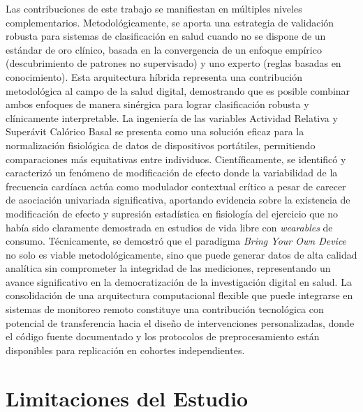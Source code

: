 
Las contribuciones de este trabajo se manifiestan en múltiples niveles complementarios. Metodológicamente, se aporta una estrategia de validación robusta para sistemas de clasificación en salud cuando no se dispone de un estándar de oro clínico, basada en la convergencia de un enfoque empírico (descubrimiento de patrones no supervisado) y uno experto (reglas basadas en conocimiento). Esta arquitectura híbrida representa una contribución metodológica al campo de la salud digital, demostrando que es posible combinar ambos enfoques de manera sinérgica para lograr clasificación robusta y clínicamente interpretable. La ingeniería de las variables Actividad Relativa y Superávit Calórico Basal se presenta como una solución eficaz para la normalización fisiológica de datos de dispositivos portátiles, permitiendo comparaciones más equitativas entre individuos. Científicamente, se identificó y caracterizó un fenómeno de modificación de efecto donde la variabilidad de la frecuencia cardíaca actúa como modulador contextual crítico a pesar de carecer de asociación univariada significativa, aportando evidencia sobre la existencia de modificación de efecto y supresión estadística en fisiología del ejercicio que no había sido claramente demostrada en estudios de vida libre con \textit{wearables} de consumo. Técnicamente, se demostró que el paradigma \textit{Bring Your Own Device} no solo es viable metodológicamente, sino que puede generar datos de alta calidad analítica sin comprometer la integridad de las mediciones, representando un avance significativo en la democratización de la investigación digital en salud. La consolidación de una arquitectura computacional flexible que puede integrarse en sistemas de monitoreo remoto constituye una contribución tecnológica con potencial de transferencia hacia el diseño de intervenciones personalizadas, donde el código fuente documentado y los protocolos de preprocesamiento están disponibles para replicación en cohortes independientes.

\section{Limitaciones del Estudio}
\label{sec:limitaciones}

